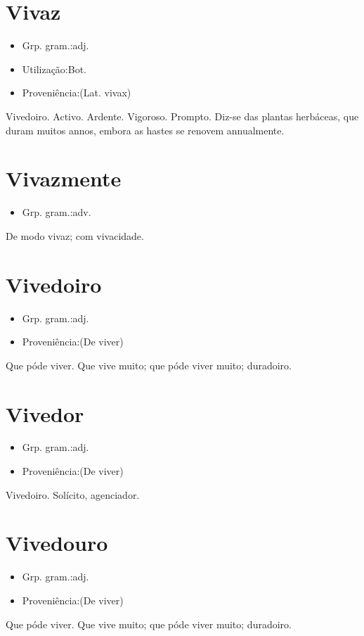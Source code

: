 \documentclass{article}
\begin{document}
\section{Vivaz}
\begin{itemize}
\item {Grp. gram.:adj.}
\end{itemize}
\begin{itemize}
\item {Utilização:Bot.}
\end{itemize}
\begin{itemize}
\item {Proveniência:(Lat. \textunderscore vivax\textunderscore )}
\end{itemize}
Vivedoiro.
Activo.
Ardente.
Vigoroso.
Prompto.
Diz-se das plantas herbáceas, que duram muitos annos, embora as hastes se renovem annualmente.
\section{Vivazmente}
\begin{itemize}
\item {Grp. gram.:adv.}
\end{itemize}
De modo vivaz; com vivacidade.
\section{Vivedoiro}
\begin{itemize}
\item {Grp. gram.:adj.}
\end{itemize}
\begin{itemize}
\item {Proveniência:(De \textunderscore viver\textunderscore )}
\end{itemize}
Que póde viver.
Que vive muito; que póde viver muito; duradoiro.
\section{Vivedor}
\begin{itemize}
\item {Grp. gram.:adj.}
\end{itemize}
\begin{itemize}
\item {Proveniência:(De \textunderscore viver\textunderscore )}
\end{itemize}
Vivedoiro.
Solícito, agenciador.
\section{Vivedouro}
\begin{itemize}
\item {Grp. gram.:adj.}
\end{itemize}
\begin{itemize}
\item {Proveniência:(De \textunderscore viver\textunderscore )}
\end{itemize}
Que póde viver.
Que vive muito; que póde viver muito; duradoiro.
\end{document}
